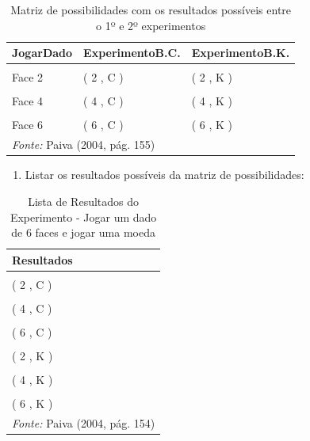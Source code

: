\documentclass[
]{book}
\providecommand{\tightlist}{%
  \setlength{\itemsep}{0pt}\setlength{\parskip}{0pt}}
\begin{document}
\begin{table}

\caption{\label{tab:unnamed-chunk-3}Matriz de possibilidades com os resultados possíveis entre o 1º e 2º experimentos}
\centering
\begin{tabular}[t]{lll}
\toprule
JogarDado & ExperimentoB.C. & ExperimentoB.K.\\
\midrule
\cellcolor{gray!6}{Face 1} & \cellcolor{gray!6}{( 1 , C )} & \cellcolor{gray!6}{( 1 , K )}\\
Face 2 & ( 2 , C ) & ( 2 , K )\\
\cellcolor{gray!6}{Face 3} & \cellcolor{gray!6}{( 3 , C )} & \cellcolor{gray!6}{( 3 , K )}\\
Face 4 & ( 4 , C ) & ( 4 , K )\\
\cellcolor{gray!6}{Face 5} & \cellcolor{gray!6}{( 5 , C )} & \cellcolor{gray!6}{( 5 , K )}\\
\addlinespace
Face 6 & ( 6 , C ) & ( 6 , K )\\
\bottomrule
\multicolumn{3}{l}{\rule{0pt}{1em}\textit{Fonte: } Paiva (2004, pág. 155)}\\
\end{tabular}
\end{table}

\begin{enumerate}
\def\labelenumi{\arabic{enumi}.}
\setcounter{enumi}{1}
\tightlist
\item
  Listar os resultados possíveis da matriz de possibilidades:
\end{enumerate}

\begin{table}

\caption{\label{tab:unnamed-chunk-4}Lista de Resultados do Experimento - Jogar um dado de 6 faces e jogar uma moeda}
\centering
\begin{tabular}[t]{l}
\toprule
Resultados\\
\midrule
\cellcolor{gray!6}{( 1 , C )}\\
( 2 , C )\\
\cellcolor{gray!6}{( 3 , C )}\\
( 4 , C )\\
\cellcolor{gray!6}{( 5 , C )}\\
\addlinespace
( 6 , C )\\
\cellcolor{gray!6}{( 1 , K )}\\
( 2 , K )\\
\cellcolor{gray!6}{( 3 , K )}\\
( 4 , K )\\
\addlinespace
\cellcolor{gray!6}{( 5 , K )}\\
( 6 , K )\\
\bottomrule
\multicolumn{1}{l}{\rule{0pt}{1em}\textit{Fonte: } Paiva (2004, pág. 154)}\\
\end{tabular}
\end{table}
\end{document}
